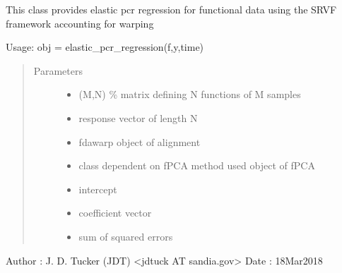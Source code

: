 \documentclass[letterpaper,10pt,english]{sphinxmanual}
\begin{document}

\begin{fulllineitems}
\label{\detokenize{pcr_regression:pcr_regression.elastic_pcr_regression}}
This class provides elastic pcr regression for functional data using the
SRVF framework accounting for warping

Usage:  obj = elastic\_pcr\_regression(f,y,time)
\begin{quote}\begin{description}
\item[{Parameters}] \leavevmode\begin{itemize}
\item {} 
 \textendash{} (M,N) \% matrix defining N functions of M samples

\item {} 
 \textendash{} response vector of length N

\item {} 
 \textendash{} fdawarp object of alignment

\item {} 
 \textendash{} class dependent on fPCA method used object of fPCA

\item {} 
 \textendash{} intercept

\item {} 
 \textendash{} coefficient vector

\item {} 
 \textendash{} sum of squared errors

\end{itemize}

\end{description}\end{quote}

Author :  J. D. Tucker (JDT) \textless{}jdtuck AT sandia.gov\textgreater{}
Date   :  18\sphinxhyphen{}Mar\sphinxhyphen{}2018


\end{fulllineitems}
\end{document}
